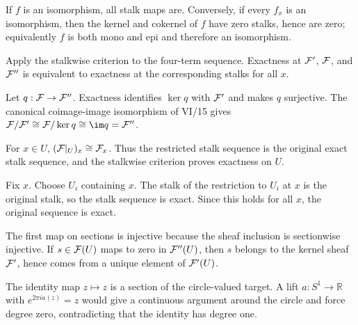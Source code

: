 \begin{solution}[Exercise VI.16.9]
If $f$ is an isomorphism, all stalk maps are.  Conversely, if every $f_x$ is an isomorphism, then the kernel and cokernel of $f$ have zero stalks, hence are zero; equivalently $f$ is both mono and epi and therefore an isomorphism.
\end{solution}

\begin{solution}[Exercise VI.16.10]
Apply the stalkwise criterion to the four-term sequence.  Exactness at $\mathcal F'$, $\mathcal F$, and $\mathcal F''$ is equivalent to exactness at the corresponding stalks for all $x$.
\end{solution}

\begin{solution}[Exercise VI.16.11]
Let $q:\mathcal F\to\mathcal F''$.  Exactness identifies $\ker q$ with $\mathcal F'$ and makes $q$ surjective.  The canonical coimage-image isomorphism of VI/15 gives $\F/\F'\cong\F/\ker q\cong\im q=\F''$.
\end{solution}

\begin{solution}[Exercise VI.16.12]
For $x\in U$, $(\mathcal F|_U)_x\cong\mathcal F_x$.  Thus the restricted stalk sequence is the original exact stalk sequence, and the stalkwise criterion proves exactness on $U$.
\end{solution}

\begin{solution}[Exercise VI.16.13]
Fix $x$.  Choose $U_i$ containing $x$.  The stalk of the restriction to $U_i$ at $x$ is the original stalk, so the stalk sequence is exact.  Since this holds for all $x$, the original sequence is exact.
\end{solution}

\begin{solution}[Exercise VI.16.14]
The first map on sections is injective because the sheaf inclusion is sectionwise injective.  If $s\in\mathcal F(U)$ maps to zero in $\mathcal F''(U)$, then $s$ belongs to the kernel sheaf $\mathcal F'$, hence comes from a unique element of $\mathcal F'(U)$.
\end{solution}

\begin{solution}[Exercise VI.16.15]
The identity map $z\mapsto z$ is a section of the circle-valued target.  A lift $a:S^1\to\mathbb R$ with $e^{2\pi ia(z)}=z$ would give a continuous argument around the circle and force degree zero, contradicting that the identity has degree one.
\end{solution}

